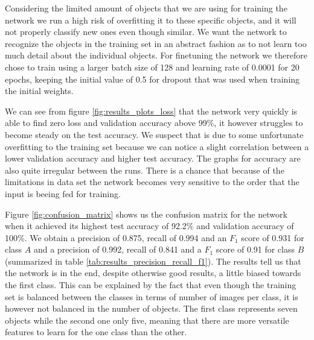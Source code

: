Considering the limited amount of objects that we are using for training the network we run a high risk of overfitting it to these specific objects, and it will not properly classify new ones even though similar. We want the network to recognize the objects in the training set in an abstract fashion as to not learn too much detail about the individual objects. For finetuning the network we therefore chose to train using a larger batch size of 128 and learning rate of 0.0001 for 20 epochs, keeping the initial value of 0.5 for dropout that was used when training the initial weights.

We can see from figure \ref{fig:results_plots_loss} that the network very quickly is able to find zero loss and validation accuracy above 99\%, it however struggles to become steady on the test accuracy. We suspect that is due to some unfortunate overfitting to the training set because we can notice a slight correlation between a lower validation accuracy and higher test accuracy. The graphs for accuracy are also quite irregular between the runs. There is a chance that because of the limitations in data set the network becomes very sensitive to the order that the input is beeing fed for training.

Figure \ref{fig:confusion_matrix} shows us the confusion matrix for the network when it achieved its highest test accuracy of 92.2\% and validation accuracy of 100\%. We obtain a precision of 0.875, recall of 0.994 and an \(F_1\) score of 0.931 for class \(A\) and a precision of 0.992, recall of 0.841 and a \(F_1\) score of 0.91 for class \(B\) (summarized in table \ref{tab:results_precision_recall_f1}). The results tell us that the network is in the end, despite otherwise good results, a little biased towards the first class. This can be explained by the fact that even though the training set is balanced between the classes in terms of number of images per class, it is however not balanced in the number of objects. The first class represents seven objects while the second one only five, meaning that there are more versatile features to learn for the one class than the other.


